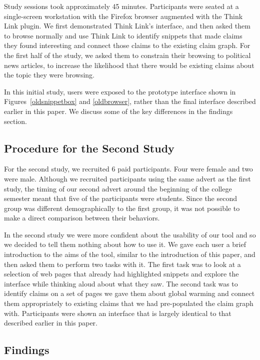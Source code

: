 \documentclass{chi2009}
\begin{document}
Study sessions took approximately 45 minutes. Participants were seated at a single-screen workstation with the Firefox browser augmented with the Think Link plugin. We first demonstrated Think Link's interface, and then asked them to browse normally and use Think Link to identify snippets that made claims they found interesting and connect those claims to the existing claim graph. For the first half of the study, we asked them to constrain their browsing to political news articles, to increase the likelihood that there would be existing claims about the topic they were browsing.

In this initial study, users were exposed to the prototype interface shown in Figures~\ref{oldsnippetbox} and \ref{oldbrowser}, rather than the final interface described earlier in this paper. We discuss some of the key differences in the findings section.

\subsection{Procedure for the Second Study}

For the second study, we recruited 6 paid participants. Four were female and two were male. Although we recruited participants using the same advert as the first study, the timing of our second advert around the beginning of the college semester meant that five of the participants were students. Since the second group was different demographically to the first group, it was not possible to make a direct comparison between their behaviors. 

In the second study we were more confident about the usability of our tool and so we decided to tell them nothing about how to use it. We gave each user a brief introduction to the aims of the tool, similar to the introduction of this paper, and then asked them to perform two tasks with it. The first task was to look at a selection of web pages that already had highlighted snippets and explore the interface while thinking aloud about what they saw. The second task was to identify claims on a set of pages we gave them about global warming and connect them appropriately to existing claims that we had pre-populated the claim graph with. Participants were shown an interface that is largely identical to that described earlier in this paper. 

\subsection{Findings}
\end{document}

